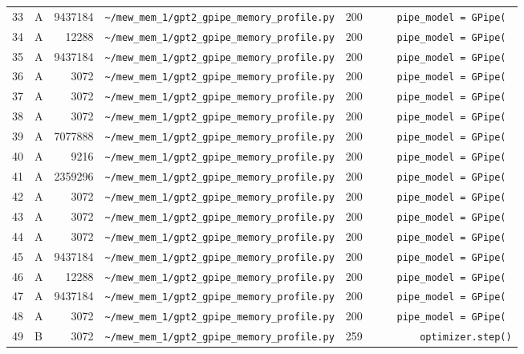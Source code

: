 \documentclass{article}
\begin{document}
\begin{longtable}{r l r p{6.5cm} r p{7.0cm}}
33 & A & 9437184 & \lstinline|~/mew_mem_1/gpt2_gpipe_memory_profile.py| & 200 & \lstinline|    pipe_model = GPipe(| \\
34 & A & 12288 & \lstinline|~/mew_mem_1/gpt2_gpipe_memory_profile.py| & 200 & \lstinline|    pipe_model = GPipe(| \\
35 & A & 9437184 & \lstinline|~/mew_mem_1/gpt2_gpipe_memory_profile.py| & 200 & \lstinline|    pipe_model = GPipe(| \\
36 & A & 3072 & \lstinline|~/mew_mem_1/gpt2_gpipe_memory_profile.py| & 200 & \lstinline|    pipe_model = GPipe(| \\
37 & A & 3072 & \lstinline|~/mew_mem_1/gpt2_gpipe_memory_profile.py| & 200 & \lstinline|    pipe_model = GPipe(| \\
38 & A & 3072 & \lstinline|~/mew_mem_1/gpt2_gpipe_memory_profile.py| & 200 & \lstinline|    pipe_model = GPipe(| \\
39 & A & 7077888 & \lstinline|~/mew_mem_1/gpt2_gpipe_memory_profile.py| & 200 & \lstinline|    pipe_model = GPipe(| \\
40 & A & 9216 & \lstinline|~/mew_mem_1/gpt2_gpipe_memory_profile.py| & 200 & \lstinline|    pipe_model = GPipe(| \\
41 & A & 2359296 & \lstinline|~/mew_mem_1/gpt2_gpipe_memory_profile.py| & 200 & \lstinline|    pipe_model = GPipe(| \\
42 & A & 3072 & \lstinline|~/mew_mem_1/gpt2_gpipe_memory_profile.py| & 200 & \lstinline|    pipe_model = GPipe(| \\
43 & A & 3072 & \lstinline|~/mew_mem_1/gpt2_gpipe_memory_profile.py| & 200 & \lstinline|    pipe_model = GPipe(| \\
44 & A & 3072 & \lstinline|~/mew_mem_1/gpt2_gpipe_memory_profile.py| & 200 & \lstinline|    pipe_model = GPipe(| \\
45 & A & 9437184 & \lstinline|~/mew_mem_1/gpt2_gpipe_memory_profile.py| & 200 & \lstinline|    pipe_model = GPipe(| \\
46 & A & 12288 & \lstinline|~/mew_mem_1/gpt2_gpipe_memory_profile.py| & 200 & \lstinline|    pipe_model = GPipe(| \\
47 & A & 9437184 & \lstinline|~/mew_mem_1/gpt2_gpipe_memory_profile.py| & 200 & \lstinline|    pipe_model = GPipe(| \\
48 & A & 3072 & \lstinline|~/mew_mem_1/gpt2_gpipe_memory_profile.py| & 200 & \lstinline|    pipe_model = GPipe(| \\
49 & B & 3072 & \lstinline|~/mew_mem_1/gpt2_gpipe_memory_profile.py| & 259 & \lstinline|        optimizer.step()| \\

\end{longtable}
\end{document}
